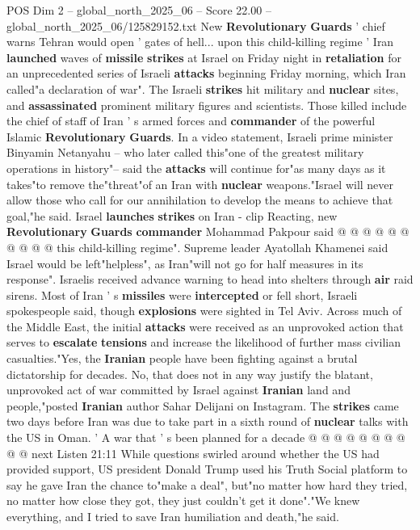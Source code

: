 \begin{textsample}{POS Dim 2 – global\_north\_2025\_06 – Score 22.00 – global\_north\_2025\_06/125829152.txt}  \label{ex:f2_pos_359}
New \textbf{Revolutionary} \textbf{Guards} ' chief warns Tehran would open ' gates of hell... upon this child-killing regime ' Iran \textbf{launched} waves of \textbf{missile} \textbf{strikes} at Israel on Friday night in \textbf{retaliation} for an unprecedented series of Israeli \textbf{attacks} beginning Friday morning, which Iran called"a declaration of war".
The Israeli \textbf{strikes} hit military and \textbf{nuclear} sites, and \textbf{assassinated} prominent military figures and scientists.
Those killed include the chief of staff of Iran ' s armed forces and \textbf{commander} of the powerful Islamic \textbf{Revolutionary} \textbf{Guards}.
In a video statement, Israeli prime minister Binyamin Netanyahu -- who later called this"one of the greatest military operations in history"-- said the \textbf{attacks} will continue for"as many days as it takes"to remove the"threat"of an Iran with \textbf{nuclear} weapons."Israel will never allow those who call for our annihilation to develop the means to achieve that goal,"he said.
Israel \textbf{launches} \textbf{strikes} on Iran - clip Reacting, new \textbf{Revolutionary} \textbf{Guards} \textbf{commander} Mohammad Pakpour said @ @ @ @ @ @ @ @ @ @ this child-killing regime".
Supreme leader Ayatollah Khamenei said Israel would be left"helpless", as Iran"will not go for half measures in its response".
Israelis received advance warning to head into shelters through \textbf{air} raid sirens.
Most of Iran ' s \textbf{missiles} were \textbf{intercepted} or fell short, Israeli spokespeople said, though \textbf{explosions} were sighted in Tel Aviv.
Across much of the Middle East, the initial \textbf{attacks} were received as an unprovoked action that serves to \textbf{escalate} \textbf{tensions} and increase the likelihood of further mass civilian casualties."Yes, the \textbf{Iranian} people have been fighting against a brutal dictatorship for decades.
No, that does not in any way justify the blatant, unprovoked act of war committed by Israel against \textbf{Iranian} land and people,"posted \textbf{Iranian} author Sahar Delijani on Instagram.
The \textbf{strikes} came two days before Iran was due to take part in a sixth round of \textbf{nuclear} talks with the US in Oman. ' A war that ' s been planned for a decade @ @ @ @ @ @ @ @ @ @ next Listen 21:11 While questions swirled around whether the US had provided support, US president Donald Trump used his Truth Social platform to say he gave Iran the chance to"make a deal", but"no matter how hard they tried, no matter how close they got, they just couldn't get it done"."We knew everything, and I tried to save Iran humiliation and death,"he said.

\end{textsample}

